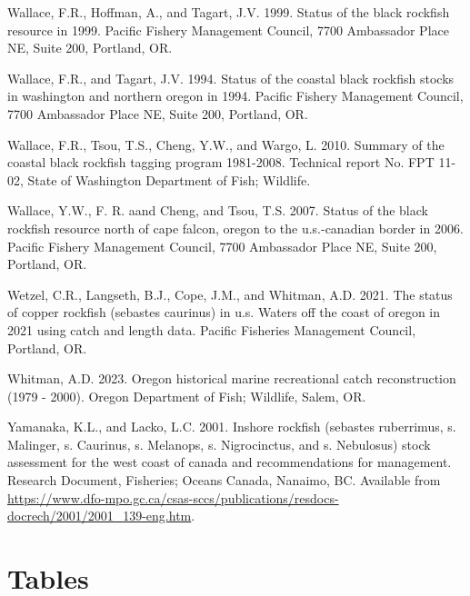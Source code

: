 \documentclass[11pt,
  english,
  letterpaper,
]{article}
\newlength{\cslhangindent}
\newenvironment{CSLReferences}[2] %
 {%
  \setlength{\parindent}{0pt}
  \ifodd #1 \everypar{\setlength{\hangindent}{\cslhangindent}}\ignorespaces\fi
  \ifnum #2 > 0
  \setlength{\parskip}{#2\baselineskip}
  \fi
 }%
 {}
\begin{document}
\begin{CSLReferences}{1}{0}
\leavevmode{}%
Wallace, F.R., Hoffman, A., and Tagart, J.V. 1999. Status of the black rockfish resource in 1999. Pacific Fishery Management Council, 7700 Ambassador Place NE, Suite 200, Portland, OR.

\leavevmode{}%
Wallace, F.R., and Tagart, J.V. 1994. Status of the coastal black rockfish stocks in washington and northern oregon in 1994. Pacific Fishery Management Council, 7700 Ambassador Place NE, Suite 200, Portland, OR.

\leavevmode{}%
Wallace, F.R., Tsou, T.S., Cheng, Y.W., and Wargo, L. 2010. Summary of the coastal black rockfish tagging program 1981-2008. Technical report No. FPT 11-02, State of Washington Department of Fish; Wildlife.

\leavevmode{}%
Wallace, Y.W., F. R. aand Cheng, and Tsou, T.S. 2007. Status of the black rockfish resource north of cape falcon, oregon to the u.s.-canadian border in 2006. Pacific Fishery Management Council, 7700 Ambassador Place NE, Suite 200, Portland, OR.

\leavevmode{}%
Wetzel, C.R., Langseth, B.J., Cope, J.M., and Whitman, A.D. 2021. The status of copper rockfish (sebastes caurinus) in u.s. Waters off the coast of oregon in 2021 using catch and length data. Pacific Fisheries Management Council, Portland, {OR}.

\leavevmode{}%
Whitman, A.D. 2023. Oregon historical marine recreational catch reconstruction (1979 - 2000). Oregon Department of Fish; Wildlife, Salem, {OR}.

\leavevmode{}%
Yamanaka, K.L., and Lacko, L.C. 2001. Inshore rockfish (sebastes ruberrimus, s. Malinger, s. Caurinus, s. Melanops, s. Nigrocinctus, and s. Nebulosus) stock assessment for the west coast of canada and recommendations for management. Research Document, Fisheries; Oceans Canada, Nanaimo, {BC}. Available from \url{https://www.dfo-mpo.gc.ca/csas-sccs/publications/resdocs-docrech/2001/2001_139-eng.htm}.

\end{CSLReferences}

\clearpage

\hypertarget{tables}{%
\section{Tables}\label{tables}}
\end{document}
